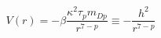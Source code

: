 \begin{equation}
V(r) = - \beta \frac{\kappa^2 \tau_p m_{Dp}}{r^{7-p}} \equiv -\frac{h^2}{r^{7-p}}
\label{PE}
\end{equation}

